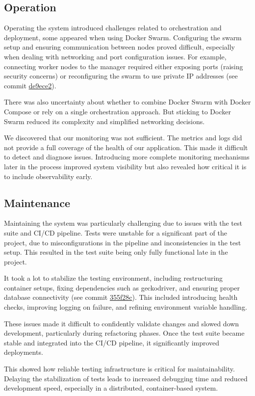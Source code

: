 \subsection{Operation}

Operating the system introduced challenges related to orchestration and deployment, some appeared when using Docker Swarm. Configuring the swarm setup and ensuring communication between nodes proved difficult, especially when dealing with networking and port configuration issues. For example, connecting worker nodes to the manager required either exposing ports (raising security concerns) or reconfiguring the swarm to use private IP addresses (see commit \href{https://github.com/sebsthiel/minitwit-devops/commit/de9ece2321d66eeb74f87014aebf46655bbc92cb}{de9ece2}).

There was also uncertainty about whether to combine Docker Swarm with Docker Compose or rely on a single orchestration approach. But sticking to Docker Swarm reduced its complexity and simplified networking decisions.

We discovered that our monitoring was not sufficient. The metrics and logs did not provide a full coverage of the health of our application.  
This made it difficult to detect and diagnose issues. Introducing more complete monitoring mechanisms later in the process improved system visibility but also revealed how critical it is to include observability early.

\subsection{Maintenance}

Maintaining the system was particularly challenging due to issues with the test suite and CI/CD pipeline. Tests were unstable for a significant part of the project, due to misconfigurations in the pipeline and inconsistencies in the test setup. This resulted in the test suite being only fully functional late in the project.

It took a lot to stabilize the testing environment, including restructuring container setups, fixing dependencies such as geckodriver, and ensuring proper database connectivity (see commit  \href{https://github.com/sebsthiel/minitwit-devops/commit/355f28c316aa33d9a324e6a0f35a3c6d165aa6f5}{355f28c}). This included introducing health checks, improving logging on failure, and refining environment variable handling.

These issues made it difficult to confidently validate changes and slowed down development, particularly during refactoring phases. Once the test suite became stable and integrated into the CI/CD pipeline, it significantly improved deployments.

This showed how reliable testing infrastructure is critical for maintainability. Delaying the stabilization of tests leads to increased debugging time and reduced development speed, especially in a distributed, container-based system.

